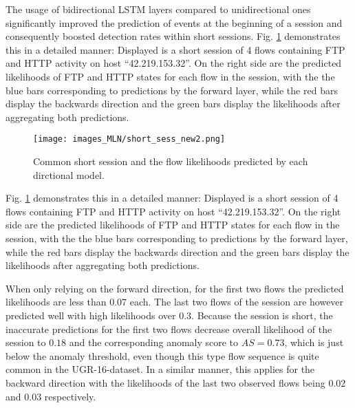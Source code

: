The usage of bidirectional LSTM layers compared to unidirectional ones significantly improved the prediction of events at the beginning of a session and consequently boosted detection rates within short sessions. Fig. \ref{fig:short_sess} demonstrates this in a detailed manner: Displayed is a short session of 4 flows containing FTP and HTTP activity on host ``42.219.153.32''. On the right side are the predicted likelihoods of FTP and HTTP states for each flow in the session, with the the blue bars corresponding to predictions by the forward layer, while the red bars display the backwards direction and the green bars display the likelihoods after aggregating both predictions. %

\begin{figure}[ht]
\centering
\texttt{[image: images\_MLN/short\_sess\_new2.png]} \caption{Common short session and the flow likelihoods predicted by each dirctional model.}\label{fig:short_sess}
\end{figure}

Fig. \ref{fig:short_sess} demonstrates this in a detailed manner: Displayed is a short session of 4 flows containing FTP and HTTP activity on host ``42.219.153.32''. On the right side are the predicted likelihoods of FTP and HTTP states for each flow in the session, with the the blue bars corresponding to predictions by the forward layer, while the red bars display the backwards direction and the green bars display the likelihoods after aggregating both predictions. 

When only relying on the forward direction, for the first two flows the predicted likelihoods are less than $0.07$ each. 
The last two flows of the session are however predicted well with high likelihoods over $0.3$. Because the session is short, the inaccurate predictions for the first two flows decrease overall likelihood of the session to $0.18$ and the corresponding anomaly score to $AS=0.73$, which is just below the anomaly threshold, even though this type flow sequence is quite common in the UGR-16-dataset.
In a similar manner, this applies for the backward direction with  the likelihoods of the last two observed flows being $0.02$ and $0.03$ respectively. 


